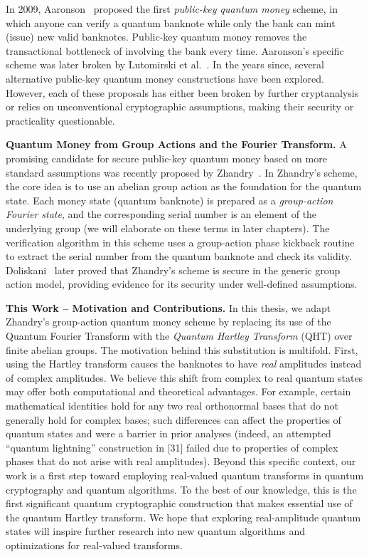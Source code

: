 \documentclass[12pt]{report}
\begin{document}
In 2009, Aaronson~\cite{Aaronson2009} proposed the first \emph{public-key quantum money} scheme, in which anyone can verify a quantum banknote while only the bank can mint (issue) new valid banknotes. Public-key quantum money removes the transactional bottleneck of involving the bank every time. Aaronson’s specific scheme was later broken by Lutomirski et al.~\cite{Lutomirski2010}. In the years since, several alternative public-key quantum money constructions have been explored. However, each of these proposals has either been broken by further cryptanalysis or relies on unconventional cryptographic assumptions, making their security or practicality questionable.

\medskip\noindent\textbf{Quantum Money from Group Actions and the Fourier Transform.} 
A promising candidate for secure public-key quantum money based on more standard assumptions was recently proposed by Zhandry~\cite{Zhandry2022}. In Zhandry’s scheme, the core idea is to use an abelian group action as the foundation for the quantum state. Each money state (quantum banknote) is prepared as a \emph{group-action Fourier state}, and the corresponding serial number is an element of the underlying group (we will elaborate on these terms in later chapters). The verification algorithm in this scheme uses a group-action phase kickback routine to extract the serial number from the quantum banknote and check its validity. Doliskani~\cite{Doliskani2023} later proved that Zhandry’s scheme is secure in the generic group action model, providing evidence for its security under well-defined assumptions.

\medskip\noindent\textbf{This Work – Motivation and Contributions.} 
In this thesis, we adapt Zhandry’s group-action quantum money scheme by replacing its use of the Quantum Fourier Transform with the \emph{Quantum Hartley Transform} (QHT) over finite abelian groups. The motivation behind this substitution is multifold. First, using the Hartley transform causes the banknotes to have \emph{real} amplitudes instead of complex amplitudes. We believe this shift from complex to real quantum states may offer both computational and theoretical advantages. For example, certain mathematical identities hold for any two real orthonormal bases that do not generally hold for complex bases; such differences can affect the properties of quantum states and were a barrier in prior analyses (indeed, an attempted “quantum lightning” construction in [31] failed due to properties of complex phases that do not arise with real amplitudes). Beyond this specific context, our work is a first step toward employing real-valued quantum transforms in quantum cryptography and quantum algorithms. To the best of our knowledge, this is the first significant quantum cryptographic construction that makes essential use of the quantum Hartley transform. We hope that exploring real-amplitude quantum states will inspire further research into new quantum algorithms and optimizations for real-valued transforms.
\end{document}
